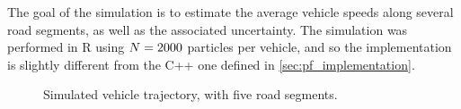 The goal of the simulation is to estimate the average vehicle speeds along several road segments, as well as the associated uncertainty. The simulation was performed in R \citep{rcore} using $N = 2000$ particles per vehicle, and so the implementation is slightly different from the C++ one defined in \cref{sec:pf_implementation}.

\begin{knitrout}\small
{}\color{fgcolor}\begin{figure}
\newline
{}
\caption[Simulated vehicle trajectory, with five road segments]{Simulated vehicle trajectory, with five road segments.}\label{fig:sim1_graph}
\end{figure}


\end{knitrout}

